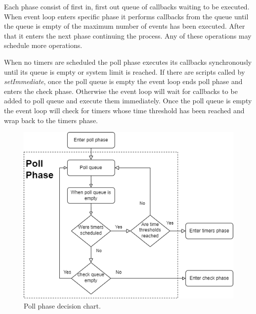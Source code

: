 Each phase consist of first in, first out queue of callbacks waiting to be executed.
When event loop enters specific phase it performs callbacks from the queue until the queue is empty of the maximum number of events has been executed.
After that it enters the next phase continuing the process.
Any of these operations may schedule more operations.

When no timers are scheduled the poll phase executes its callbacks synchronously until its queue is empty or system limit is reached.
If there are scripts called by \textit{setImmediate}, once the poll queue is empty the event loop ends poll phase and enters the check phase.
Otherwise the event loop will wait for callbacks to be added to poll queue and execute them immediately.
Once the poll queue is empty the event loop will check for timers whose time threshold has been reached and wrap back to the timers phase.

\begin{figure}[ht!]
    \includegraphics[scale=0.8]{images/poll_phase_flow_chart.png}
    \caption{Poll phase decision chart.}
    \label{figure:nodejs:pollPhase}
\end{figure}